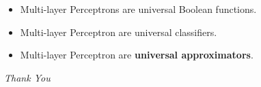 \documentclass[12pt,aspectratio=169]{beamer}
\begin{document}
\begin{frame}
\begin{itemize}
\item Multi-layer Perceptrons are universal Boolean functions.
\bigskip
\item Multi-layer Perceptron are universal classifiers.
\bigskip
\item Multi-layer Perceptron are \textbf{universal approximators}.
\end{itemize}
\end{frame}

\begin{frame}{}
  \centering \Huge
  \emph{Thank You}
\end{frame}
\end{document}

